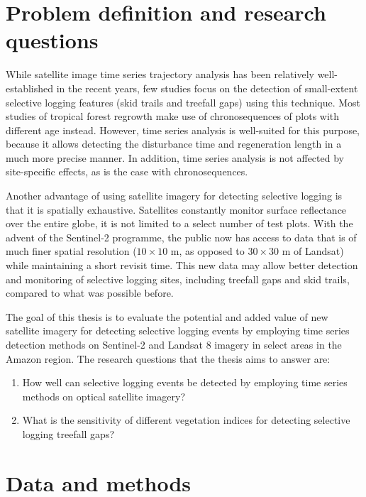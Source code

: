 \documentclass[a4paper,12pt]{scrbook}
\begin{document}
\chapter{Problem definition and research questions}

While satellite image time series trajectory analysis has been relatively well-established in the recent years, few studies focus on the detection of small-extent selective logging features (skid trails and treefall gaps) using this technique. Most studies of tropical forest regrowth make use of chronosequences of plots with different age instead. However, time series analysis is well-suited for this purpose, because it allows detecting the disturbance time and regeneration length in a much more precise manner. In addition, time series analysis is not affected by site-specific effects, as is the case with chronosequences.


Another advantage of using satellite imagery for detecting selective logging is that it is spatially exhaustive. Satellites constantly monitor surface reflectance over the entire globe, it is not limited to a select number of test plots. With the advent of the Sentinel-2 programme, the public now has access to data that is of much finer spatial resolution ($10\times10$ m, as opposed to $30\times30$ m of Landsat) while maintaining a short revisit time. This new data may allow better detection and monitoring of selective logging sites, including treefall gaps and skid trails, compared to what was possible before.

The goal of this thesis is to evaluate the potential and added value of new satellite imagery for detecting selective logging events by employing time series detection methods on Sentinel-2 and Landsat 8 imagery in select areas in the Amazon region. The research questions that the thesis aims to answer are:

\begin{enumerate}
 \item How well can selective logging events be detected by employing time series methods on optical satellite imagery?
 \item What is the sensitivity of different vegetation indices for detecting selective logging treefall gaps?
\end{enumerate}

\chapter{Data and methods}
\end{document}
